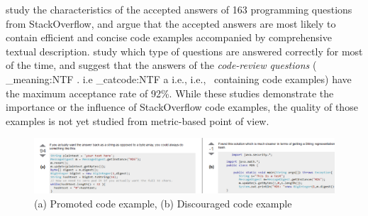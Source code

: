 \documentclass[conference]{IEEEtran}
\makeatletter
\newcommand\latinabbrev[1]{
  \peek_meaning:NTF . {%
    #1\@}%
  { \peek_catcode:NTF a {%
      #1., \@ }%
    {#1., \@}}}
\def\ie{\latinabbrev{i.e}}
\makeatother
\begin{document}
\citet{nasehi} study the characteristics of the accepted answers of 163 programming questions from StackOverflow, and argue that  the accepted answers are most likely to contain efficient and concise code examples accompanied by comprehensive textual description. 
\citet{nier} study which type of questions are answered correctly for most of the time, and suggest that the answers of the \emph{code-review questions} (\ie\ containing code examples) have the maximum acceptance rate of 92\%.
While these studies demonstrate the importance or the influence of StackOverflow code examples, the quality of those examples is not yet studied from metric-based point of view.

\begin{figure}[!t]
\centering
\includegraphics[width=7.1in ]{whole23}
\vspace{-.6cm}
\caption{(a) Promoted code example, (b) Discouraged code example}
\vspace{-.4cm}
\label{fig:example}
\end{figure}

%
\end{document}
